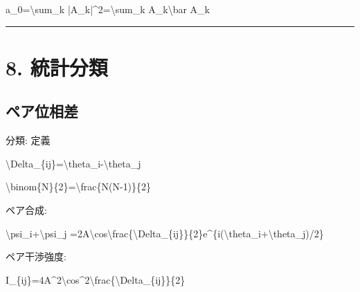 \documentclass[
  a4paper,
]{ltjsarticle}
\newenvironment{Shaded}{}{}
\newcommand{\NormalTok}[1]{#1}
\begin{document}
\begin{Shaded}
\begin{Highlighting}[]
\NormalTok{a\_0=\textbackslash{}sum\_k |A\_k|\^{}2=\textbackslash{}sum\_k A\_k\textbackslash{}bar A\_k}
\end{Highlighting}
\end{Shaded}

\begin{center}\rule{0.5\linewidth}{0.5pt}\end{center}

\section{8. 統計分類}\label{ux7d71ux8a08ux5206ux985e}

\subsection{ペア位相差}\label{ux30daux30a2ux4f4dux76f8ux5dee}

分類: 定義

\begin{Shaded}
\begin{Highlighting}[]
\NormalTok{\textbackslash{}Delta\_\{ij\}=\textbackslash{}theta\_i{-}\textbackslash{}theta\_j}
\end{Highlighting}
\end{Shaded}

\begin{Shaded}
\begin{Highlighting}[]
\NormalTok{\textbackslash{}binom\{N\}\{2\}=\textbackslash{}frac\{N(N{-}1)\}\{2\}}
\end{Highlighting}
\end{Shaded}

ペア合成:

\begin{Shaded}
\begin{Highlighting}[]
\NormalTok{\textbackslash{}psi\_i+\textbackslash{}psi\_j}
\NormalTok{=2A\textbackslash{}cos\textbackslash{}frac\{\textbackslash{}Delta\_\{ij\}\}\{2\}e\^{}\{i(\textbackslash{}theta\_i+\textbackslash{}theta\_j)/2\}}
\end{Highlighting}
\end{Shaded}

ペア干渉強度:

\begin{Shaded}
\begin{Highlighting}[]
\NormalTok{I\_\{ij\}=4A\^{}2\textbackslash{}cos\^{}2\textbackslash{}frac\{\textbackslash{}Delta\_\{ij\}\}\{2\}}
\end{Highlighting}
\end{Shaded}
\end{document}
